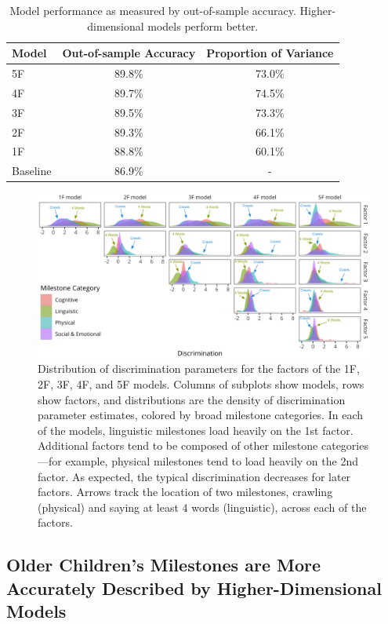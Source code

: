 \documentclass[man]{apa7}
\begin{document}
\begin{table}[!ht]
\caption{\label{tab:study1results}Model performance as measured by out-of-sample accuracy. Higher-dimensional models perform better.}
\centering
\fontsize{8}{10}\selectfont
\begin{tabular}[t]{lcc}
\toprule
Model & Out-of-sample Accuracy & Proportion of Variance\\
\midrule
5F & 89.8\% & 73.0\% \\
4F & 89.7\% & 74.5\% \\
3F & 89.5\% & 73.3\% \\
2F & 89.3\% & 66.1\% \\
1F & 88.8\% & 60.1\% \\
Baseline & 86.9\% & - \\
\bottomrule
\end{tabular}
\end{table}

\begin{figure}
\centering
\includegraphics[width=1\columnwidth]{figures/models_new.png}
\caption{Distribution of discrimination parameters for the factors of the 1F, 2F, 3F, 4F, and 5F models. Columns of subplots show models, rows show factors, and distributions are the density of discrimination parameter estimates, colored by broad milestone categories. In each of the models, linguistic milestones load heavily on the 1st factor. Additional factors tend to be composed of other milestone categories—for example, physical milestones tend to load heavily on the 2nd factor. As expected, the typical discrimination decreases for later factors. Arrows track the location of two milestones, crawling (physical) and saying at least 4 words (linguistic), across each of the factors.}
\label{fig:discs}
\end{figure}

\hypertarget{older-childrens-milestones-are-more-accurately-described-by-higher-dimensional-models}{%
\subsection*{Older Children's Milestones are More Accurately Described
by Higher-Dimensional
Models}\label{older-childrens-milestones-are-more-accurately-described-by-higher-dimensional-models}}
\end{document}
